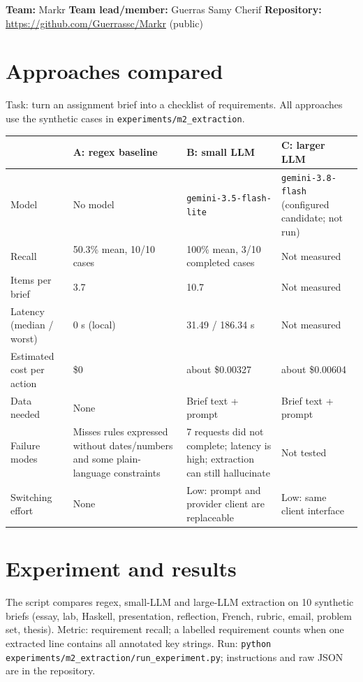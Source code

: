 \documentclass[8pt]{article}
\begin{document}
\fontsize{8}{9}\selectfont\sloppy
\textbf{Team:} Markr \quad \textbf{Team lead/member:} Guerras Samy Cherif \quad \textbf{Repository:} \url{https://github.com/Guerrassc/Markr} (public)

\section{Approaches compared}
Task: turn an assignment brief into a checklist of requirements. All approaches use the synthetic cases in \texttt{experiments/m2\_extraction}.
\footnotesize
\begin{tabular}{@{}p{2.55cm}p{4.1cm}p{4.25cm}p{4.25cm}@{}}
\toprule
 & \textbf{A: regex baseline} & \textbf{B: small LLM} & \textbf{C: larger LLM}\\
\midrule
Model & No model & \texttt{gemini-3.5-flash-lite} & \texttt{gemini-3.8-flash} (configured candidate; not run)\\
Recall & 50.3\% mean, 10/10 cases & 100\% mean, 3/10 completed cases & Not measured\\
Items per brief & 3.7 & 10.7 & Not measured\\
Latency (median / worst) & 0 s (local) & 31.49 / 186.34 s & Not measured\\
Estimated cost per action & \$0 & about \$0.00327 & about \$0.00604\\
Data needed & None & Brief text + prompt & Brief text + prompt\\
Failure modes & Misses rules expressed without dates/numbers and some plain-language constraints & 7 requests did not complete; latency is high; extraction can still hallucinate & Not tested\\
Switching effort & None & Low: prompt and provider client are replaceable & Low: same client interface\\
\bottomrule
\end{tabular}
\scriptsize

\section{Experiment and results}
The script compares regex, small-LLM and large-LLM extraction on 10 synthetic briefs (essay, lab, Haskell, presentation, reflection, French, rubric, email, problem set, thesis). Metric: requirement recall; a labelled requirement counts when one extracted line contains all annotated key strings. Run: \texttt{python experiments/m2\_extraction/run\_experiment.py}; instructions and raw JSON are in the repository.
\end{document}
